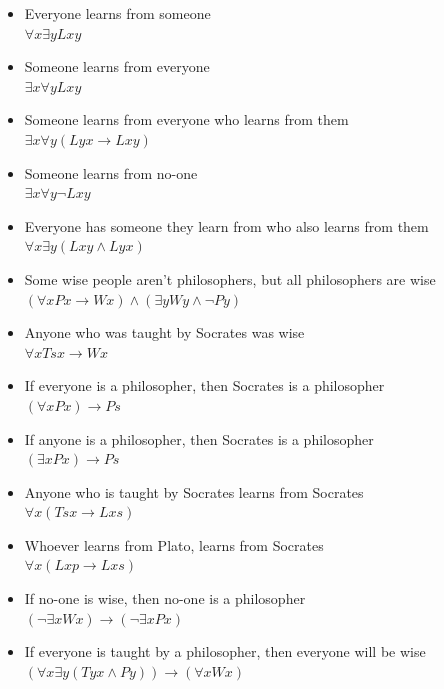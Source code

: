 \documentclass[12pt]{article}
\begin{document}
\begin{itemize}
    \item Everyone learns from someone \\
        $\forall x \exists y Lxy$
    \item Someone learns from everyone \\
        $\exists x \forall y Lxy$
    \item Someone learns from everyone who learns from them \\
        $\exists x \forall y (Lyx \rightarrow Lxy)$
    \item Someone learns from no-one \\
        $\exists x \forall y \neg Lxy$
    \item Everyone has someone they learn from who also learns from them \\
        $\forall x \exists y (Lxy \land Lyx) $
    \item Some wise people aren’t philosophers, but all philosophers are wise \\
        $(\forall x Px \rightarrow Wx) \land (\exists y Wy \land \lnot Py)$
    \item Anyone who was taught by Socrates was wise  \\
        $\forall x Tsx \rightarrow Wx$
    \item If everyone is a philosopher, then Socrates is a philosopher \\
        $(\forall x Px) \rightarrow Ps$
    \item If anyone is a philosopher, then Socrates is a philosopher \\
        $(\exists x Px) \rightarrow Ps$
    \item Anyone who is taught by Socrates learns from Socrates \\
        $\forall x (Tsx \rightarrow Lxs)$
    \item Whoever learns from Plato, learns from Socrates \\
        $\forall x (Lxp \rightarrow Lxs)$
    \item If no-one is wise, then no-one is a philosopher \\
        $(\lnot \exists x Wx) \rightarrow (\lnot \exists x Px) $
    \item If everyone is taught by a philosopher, then everyone will be wise\\
        $(\forall x \exists y (Tyx \land Py)) \rightarrow (\forall x Wx)$
\end{itemize}
\end{document}
